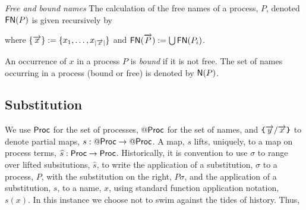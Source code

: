 \begin{definition}
  \emph{Free and bound names} The calculation of the free names of a
  process, $P$, denoted $\mathsf{FN}(P)$ is given recursively by
  
  
  where $\{\overrightarrow{x}\} := \{x_1, \ldots, x_{|\overrightarrow{x}|}\}$ and $\mathsf{FN}(\overrightarrow{P}) := \bigcup \mathsf{FN}(P_i)$.
  
  An occurrence of $x$ in a process $P$ is \textit{bound} if it is not
  free. The set of names occurring in a process (bound or free) is
  denoted by $\mathsf{N}(P)$.
\end{definition}

\subsection{Substitution}

We use $\mathsf{Proc}$ for the set of processes, $\mathsf{@} \mathsf{Proc}$ for the set of
names, and $\texttt{\{}\overrightarrow{y} / \overrightarrow{x} \texttt{\}}$ to denote partial
maps, $s : \mathsf{@} \mathsf{Proc} \rightarrow \mathsf{@} \mathsf{Proc}$. A map, $s$ lifts, uniquely, to
a map on process terms, $\widehat{s} : \mathsf{Proc} \rightarrow
\mathsf{Proc}$. Historically, it is convention to use $\sigma$ to range over
lifted subsitutions, $\widehat{s}$, to write the application of a
substitution, $\sigma$ to a process, $P$, with the substitution on the
right, $P\sigma$, and the application of a substitution, $s$, to a
name, $x$, using standard function application notation, $s(x)$. In
this instance we choose not to swim against the tides of
history. Thus, 

